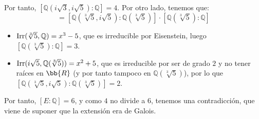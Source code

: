 \begin{ejemplo}
    Por tanto, $\left[\mathbb{Q}\left(i\sqrt{3},i\sqrt{5}\right):\mathbb{Q}\right] = 4$. Por otro lado, tenemos que:
    \begin{equation*}
        [E:\mathbb{Q}] = \left[\mathbb{Q}\left(\sqrt[3]{5},i\sqrt{5}\right):\mathbb{Q}(\sqrt[3]{5})\right]\cdot \left[\mathbb{Q}\left(\sqrt[3]{5}\right):\mathbb{Q}\right]
    \end{equation*}
    \begin{itemize}
        \item $\operatorname{Irr}(\sqrt[3]{5},\mathbb{Q}) = x^3-5$, que es irreducible por Eisenstein, luego $\left[\mathbb{Q}\left(\sqrt[3]{5}\right):\mathbb{Q}\right] = 3$.
        \item $\operatorname{Irr}(i\sqrt{5},\mathbb{Q}(\sqrt[3]{5})) = x^2+5$, que es irreducible por ser de grado $2$ y no tener raíces en $\bb{R}$ (y por tanto tampoco en $\mathbb{Q}(\sqrt[3]{5})$), por lo que $\left[\mathbb{Q}\left(\sqrt[3]{5},i\sqrt{5}\right):\mathbb{Q}(\sqrt[3]{5})\right] = 2$.
    \end{itemize}

    Por tanto, $[E:\mathbb{Q}] = 6$, y como $4$ no divide a $6$, tenemos una contradicción, que viene de suponer que la extensión era de Galois.
\end{ejemplo}

